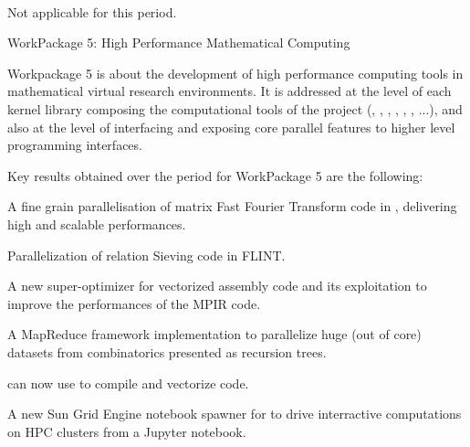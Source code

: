 \documentclass{deliverablereport}
\makeatletter
\renewcommand\subsubsection{\@startsection{subsubsection}{2}%
  \z@{.5\linespacing\@plus.7\linespacing}{.1\linespacing}%
  {\normalfont\bfseries}}
\makeatother
\begin{document}
\paragraph{} %

Not applicable for this period.

\clearpage
  \subsubsection{WorkPackage 5: High Performance Mathematical Computing}
  \label{hpc}

  Workpackage 5 is about the development of high performance computing tools in
  mathematical virtual research environments. It is addressed at the level
  of each kernel library composing the computational tools of the project (\Pari,
  \GAP, \Linbox, \MPIR, \Sage, \Singular, ...), and also at the level of interfacing and exposing
  core parallel features to higher level programming interfaces.

  Key results obtained over the period for WorkPackage 5 are the following:
  \begin{compactitem}
  \item A fine grain parallelisation of matrix Fast Fourier Transform code in
    \FLINT, delivering high and scalable performances.
  \item Parallelization of relation  Sieving code in FLINT.
  \item A new super-optimizer for vectorized assembly code and its
    exploitation to improve the performances of the MPIR code.
  \item A MapReduce framework implementation to parallelize huge (out of core) datasets from
    combinatorics presented as recursion trees.
  \item \Cython can now use \Pythran to compile and vectorize \Numpy code.
  \item A new Sun Grid Engine notebook spawner for \Jupyter to drive
    interractive computations on HPC clusters from a Jupyter notebook.
  \end{compactitem}

\paragraph{}
\end{document}
